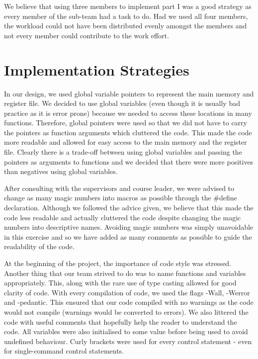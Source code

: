 \documentclass{article}
\begin{document}
We believe that using three members to implement part I was a good strategy as
every member of the sub-team had a task to do. Had we used all four members,
the workload could not have been distributed evenly amongst the members and
not every member could contribute to the work effort.

\section{Implementation Strategies}

In our design, we used global variable pointers to represent the main memory
and register file. We decided to use global variables (even though it is
usually bad practice as it is error prone) because we needed to access these
locations in many functions. Therefore, global pointers were used so that we
did not have to carry the pointers as function arguments which cluttered the
code. This made the code more readable and allowed for easy access to the main
memory and the register file. Clearly there is a trade-off between using
global variables and passing the pointers as arguments to functions and we
decided that there were more positives than negatives using global variables.

After consulting with the supervisors and course leader, we were advised to
change as many magic numbers into macros as possible through the \#define
declaration. Although we followed the advice given, we believe that this made
the code less readable and actually cluttered the code despite changing the
magic numbers into descriptive names. Avoiding magic numbers was simply
unavoidable in this exercise and so we have added as many comments as possible
to guide the readability of the code.

At the beginning of the project, the importance of code style was stressed.
Another thing that our team strived to do was to name functions and variables
appropriately. This, along with the rare use of type casting allowed for good
clarity of code. With every compilation of code, we used the flags -Wall,
-Werror and -pedantic. This ensured that our code compiled with no warnings as
the code would not compile (warnings would be converted to errors). We also
littered the code with useful comments that hopefully help the reader to
understand the code. All variables were also initialised to some value before
being used to avoid undefined behaviour. Curly brackets were used for every
control statement - even for single-command control statements.
\end{document}
